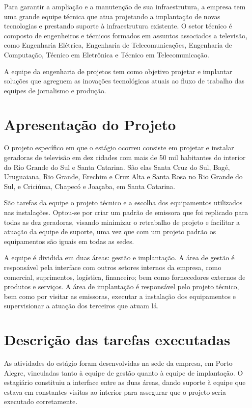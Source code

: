 \documentclass[
	12pt,				%
	oneside,			%
	a4paper,			%
	brazil
	]{abntex2}
\begin{document}
Para garantir a ampliação e a manutenção de sua infraestrutura, a empresa tem uma grande equipe técnica que atua projetando a implantação de novas tecnologias e prestando suporte à infraestrutura existente. O setor técnico é composto de engenheiros e técnicos formados em assuntos associados a televisão, como Engenharia Elétrica, Engenharia de Telecomunicações, Engenharia de Computação, Técnico em Eletrônica e Técnico em Telecomunicação.

A equipe da engenharia de projetos tem como objetivo projetar e implantar soluções que agreguem as inovações tecnológicas atuais ao fluxo de trabalho das equipes de jornalismo e produção.

\section{Apresentação do Projeto}

O projeto específico em que o estágio ocorreu consiste em projetar e instalar geradoras de televisão em dez cidades com mais de 50 mil habitantes do interior do Rio Grande do Sul e Santa Catarina. São elas Santa Cruz do Sul, Bagé, Uruguaiana, Rio Grande, Erechim e Cruz Alta e Santa Rosa no Rio Grande do Sul, e Criciúma, Chapecó e Joaçaba, em Santa Catarina.

São tarefas da equipe o projeto técnico e a escolha dos equipamentos utilizados nas instalações. Optou-se por criar um padrão de emissora que foi replicado para todas as dez geradoras, visando minimizar o retrabalho de projeto e facilitar a atuação da equipe de suporte, uma vez que com um projeto padrão os equipamentos são iguais em todas as sedes.

A equipe é dividida em duas áreas: gestão e implantação. A área de gestão é responsável pela interface com outros setores internos da empresa, como comercial, suprimentos, logística, financeiro; bem como fornecedores externos de produtos e serviços. A área de implantação é responsável pelo projeto técnico, bem como por visitar as emissoras, executar a instalação dos equipamentos e supervisionar a atuação dos terceiros que atuam lá.

\section{Descrição das tarefas executadas}

As atividades do estágio foram desenvolvidas na sede da empresa, em Porto Alegre, vinculadas tanto à equipe de gestão quanto à equipe de implantação. O estagiário constituiu a interface entre as duas áreas, dando suporte à equipe que estava em constantes visitas ao interior para assegurar que o projeto seria executado corretamente.
\end{document}
